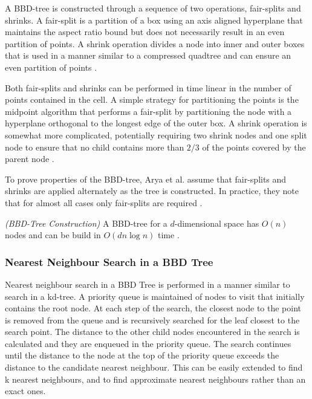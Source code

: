 \documentclass[mcs]{scsthesis}
\begin{document}
A BBD-tree is constructed through a sequence of two operations, fair-splits
and shrinks. A fair-split is a partition of a box using an axis aligned
hyperplane that maintains the aspect ratio bound but does not necessarily
result in an even partition of points. A shrink operation divides a node into
inner and outer boxes that is used in a manner similar to a compressed
quadtree and can ensure an even partition of points \cite{optimalann}.

Both fair-splits and shrinks can be performed in time linear in the number of
points contained in the cell. A simple strategy for partitioning the points is
the midpoint algorithm that performs a fair-split by partitioning the node
with a hyperplane orthogonal to the longest edge of the outer box. A shrink
operation is somewhat more complicated, potentially requiring two shrink nodes
and one split node to ensure that no child contains more than \(2/3\) of the
points covered by the parent node \cite{optimalann}.

To prove properties of the BBD-tree, Arya et al. assume that fair-splits and
shrinks are applied alternately as the tree is constructed. In practice, they
note that for almost all cases only fair-splits are required \cite{optimalann}. 

\begin{thm} \emph{(BBD-Tree Construction)} 
A BBD-tree for a \(d\)-dimensional space has \(O(n)\) nodes and can be build in
\(O(d n \log n)\) time \cite{optimalann}.
\end{thm}

\subsubsection{Nearest Neighbour Search in a BBD Tree}

Nearest neighbour search in a BBD Tree is performed in a manner similar to
search in a kd-tree. A priority queue is maintained of nodes to visit that 
initially contains the root node. At each step of the search, the closest
node to the point is removed from the queue and is recursively searched for
the leaf closest to the search point. The distance to the other child nodes
encountered in the search is calculated and they are enqueued in the priority
queue. The search continues until the distance to the node at the top of the
priority queue exceeds the distance to the candidate nearest neighbour. This
can be easily extended to find k nearest neighbours, and to find approximate
nearest neighbours rather than an exact ones.
\end{document}
